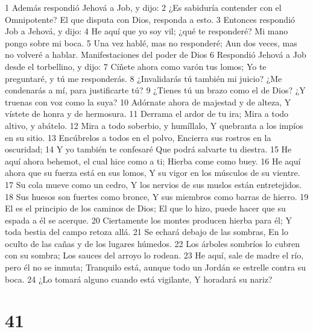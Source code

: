 1 Además respondió Jehová a Job, y dijo:
2 ¿Es sabiduría contender con el Omnipotente? 
El que disputa con Dios, responda a esto.
3 Entonces respondió Job a Jehová, y dijo:
4 He aquí que yo soy vil; ¿qué te responderé? 
Mi mano pongo sobre mi boca. 
5 Una vez hablé, mas no responderé; Aun dos veces, mas no volveré a hablar.
Manifestaciones del poder de Dios 
6 Respondió Jehová a Job desde el torbellino, y dijo:
7 Cíñete ahora como varón tus lomos;
Yo te preguntaré, y tú me responderás.
8 ¿Invalidarás tú también mi juicio?
¿Me condenarás a mí, para justificarte tú?
9 ¿Tienes tú un brazo como el de Dios?
¿Y truenas con voz como la suya?
10 Adórnate ahora de majestad y de alteza,
Y vístete de honra y de hermosura.
11 Derrama el ardor de tu ira;
Mira a todo altivo, y abátelo.
12 Mira a todo soberbio, y humíllalo,
Y quebranta a los impíos en su sitio.
13 Encúbrelos a todos en el polvo,
Encierra sus rostros en la oscuridad;
14 Y yo también te confesaré
Que podrá salvarte tu diestra.
15 He aquí ahora behemot, el cual hice como a ti;
Hierba come como buey.
16 He aquí ahora que su fuerza está en sus lomos,
Y su vigor en los músculos de su vientre.
17 Su cola mueve como un cedro,
Y los nervios de sus muslos están entretejidos.
18 Sus huesos son fuertes como bronce,
Y sus miembros como barras de hierro. 
19 El es el principio de los caminos de Dios;
El que lo hizo, puede hacer que su espada a él se acerque. 
20 Ciertamente los montes producen hierba para él;
Y toda bestia del campo retoza allá.
21 Se echará debajo de las sombras,
En lo oculto de las cañas y de los lugares húmedos.
22 Los árboles sombríos lo cubren con su sombra;
Los sauces del arroyo lo rodean. 
23 He aquí, sale de madre el río, pero él no se inmuta;
Tranquilo está, aunque todo un Jordán se estrelle contra su boca. 
24 ¿Lo tomará alguno cuando está vigilante,
Y horadará su nariz?

\chapter{41}

